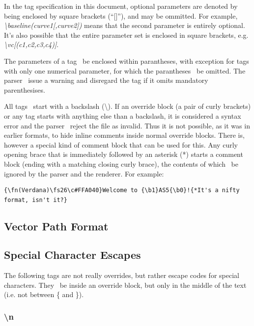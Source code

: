 \documentclass{spec}
\begin{document}
In the tag specification in this document, optional parameters are denoted by being enclosed by square
brackets (``[]''), and may be ommitted. For example, \emph{\textbackslash baseline(curve1[,curve2])}
means that the second parameter is entirely optional. It's also possible that the entire parameter set
is enclosed in square brackets, e.g. \emph{\textbackslash vc[(c1,c2,c3,c4)]}.

The parameters of a tag \must\ be enclosed within parantheses, with exception for tags with only one numerical
parameter, for which the parantheses \may\ be omitted. The parser \must\ issue a warning and disregard the tag
if it omits mandatory parenthesises.

All tags \must\ start with a backslash (\textbackslash ). If an override block (a pair of curly brackets)
or any tag starts with anything else than a backslash, it is considered a syntax error and the parser \must\
reject the file as invalid. Thus it is not possible, as it was in earlier formats, to hide inline comments
inside normal override blocks. There is, however a special kind of comment block that can be used for this.
Any curly opening brace that is immediately followed by an asterisk (*) starts a comment block (ending with
a matching closing curly brace), the contents of which \must\ be ignored by the parser and the renderer.
For example:

\begin{verbatim}
{\fn(Verdana)\fs26\c#FFA040}Welcome to {\b1}AS5{\b0}!{*It's a nifty format, isn't it?}
\end{verbatim}


\subsection{Vector Path Format}


\subsection{Special Character Escapes}
The following tags are not really overrides, but rather escape codes for special characters. They
\mustnot\ be inside an override block, but only in the middle of the text (i.e. not between \{ and \}).


\subsubsection{\textbackslash n}
\end{document}
